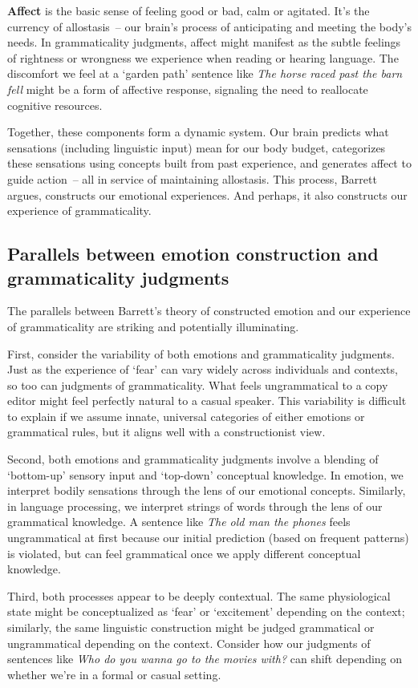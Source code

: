 \textbf{Affect} is the basic sense of feeling good or bad, calm or agitated. It's the currency of allostasis~-- our brain's process of anticipating and meeting the body's needs. In grammaticality judgments, affect might manifest as the subtle feelings of rightness or wrongness we experience when reading or hearing language. The discomfort we feel at a `garden path' sentence like \textit{The horse raced past the barn fell} might be a form of affective response, signaling the need to reallocate cognitive resources.

Together, these components form a dynamic system. Our brain predicts what sensations (including linguistic input) mean for our body budget, categorizes these sensations using concepts built from past experience, and generates affect to guide action~-- all in service of maintaining allostasis. This process, Barrett argues, constructs our emotional experiences. And perhaps, it also constructs our experience of grammaticality.

\subsection{Parallels between emotion construction and grammaticality judgments}

The parallels between Barrett's theory of constructed emotion and our experience of grammaticality are striking and potentially illuminating.

First, consider the variability of both emotions and grammaticality judgments. Just as the experience of `fear' can vary widely across individuals and contexts, so too can judgments of grammaticality. What feels ungrammatical to a copy editor might feel perfectly natural to a casual speaker. This variability is difficult to explain if we assume innate, universal categories of either emotions or grammatical rules, but it aligns well with a constructionist view.

Second, both emotions and grammaticality judgments involve a blending of `bottom-up' sensory input and `top-down' conceptual knowledge. In emotion, we interpret bodily sensations through the lens of our emotional concepts. Similarly, in language processing, we interpret strings of words through the lens of our grammatical knowledge. A sentence like \textit{The old man the phones} feels ungrammatical at first because our initial prediction (based on frequent patterns) is violated, but can feel grammatical once we apply different conceptual knowledge.

Third, both processes appear to be deeply contextual. The same physiological state might be conceptualized as `fear' or `excitement' depending on the context; similarly, the same linguistic construction might be judged grammatical or ungrammatical depending on the context. Consider how our judgments of sentences like \textit{Who do you wanna go to the movies with?} can shift depending on whether we're in a formal or casual setting.

